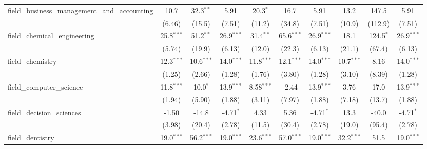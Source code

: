 \begin{tabular}{lccccccccc}
   field\_business\_management\_and\_accounting                & 10.7          & 32.3$^{**}$   & 5.91          & 20.3$^{*}$    & 16.7           & 5.91          & 13.2          & 147.5         & 5.91\\   
                                                               & (6.46)        & (15.5)        & (7.51)        & (11.2)        & (34.8)         & (7.51)        & (10.9)        & (112.9)       & (7.51)\\   
   field\_chemical\_engineering                                & 25.8$^{***}$  & 51.2$^{**}$   & 26.9$^{***}$  & 31.4$^{**}$   & 65.6$^{***}$   & 26.9$^{***}$  & 18.1          & 124.5$^{*}$   & 26.9$^{***}$\\   
                                                               & (5.74)        & (19.9)        & (6.13)        & (12.0)        & (22.3)         & (6.13)        & (21.1)        & (67.4)        & (6.13)\\   
   field\_chemistry                                            & 12.3$^{***}$  & 10.6$^{***}$  & 14.0$^{***}$  & 11.8$^{***}$  & 12.1$^{***}$   & 14.0$^{***}$  & 10.7$^{***}$  & 8.16          & 14.0$^{***}$\\   
                                                               & (1.25)        & (2.66)        & (1.28)        & (1.76)        & (3.80)         & (1.28)        & (3.10)        & (8.39)        & (1.28)\\   
   field\_computer\_science                                    & 11.8$^{***}$  & 10.0$^{*}$    & 13.9$^{***}$  & 8.58$^{***}$  & -2.44          & 13.9$^{***}$  & 3.76          & 17.0          & 13.9$^{***}$\\   
                                                               & (1.94)        & (5.90)        & (1.88)        & (3.11)        & (7.97)         & (1.88)        & (7.18)        & (13.7)        & (1.88)\\   
   field\_decision\_sciences                                   & -1.50         & -14.8         & -4.71$^{*}$   & 4.33          & 5.36           & -4.71$^{*}$   & 13.3          & -40.0         & -4.71$^{*}$\\   
                                                               & (3.98)        & (20.4)        & (2.78)        & (11.5)        & (30.4)         & (2.78)        & (19.0)        & (95.4)        & (2.78)\\   
   field\_dentistry                                            & 19.0$^{***}$  & 56.2$^{***}$  & 19.0$^{***}$  & 23.6$^{***}$  & 57.0$^{***}$   & 19.0$^{***}$  & 32.2$^{***}$  & 51.5          & 19.0$^{***}$\\   

\end{tabular}
